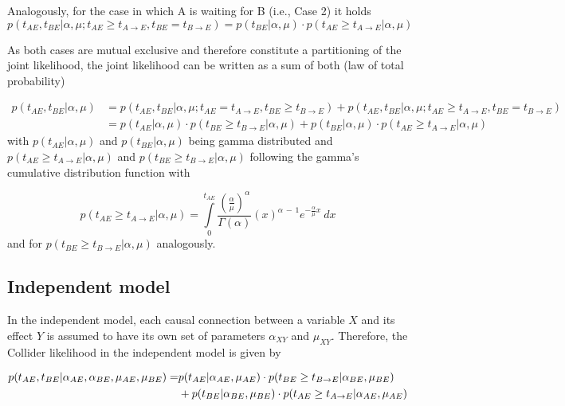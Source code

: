 Analogously, for the case in which A is waiting for B (i.e., Case 2) it holds
\begin{equation}
p(t_{AE}, t_{BE}|\alpha,\mu; t_{AE} \geq t_{A\rightarrow E}, t_{BE} = t_{B\rightarrow E}) = p(t_{BE}|\alpha,\mu)\cdot  p(t_{AE}\geq t_{A\rightarrow E}|\alpha,\mu)
\end{equation}

As both cases are mutual exclusive and therefore constitute a partitioning of the joint likelihood, the joint likelihood can be written as a sum of both (law of total probability)

\begin{align}
p(t_{AE}, t_{BE}|\alpha,\mu) &= p(t_{AE}, t_{BE}|\alpha,\mu; t_{AE} = t_{A\rightarrow E}, t_{BE} \geq t_{B\rightarrow E}) + p(t_{AE}, t_{BE}|\alpha,\mu; t_{AE} \geq t_{A\rightarrow E}, t_{BE} = t_{B\rightarrow E}) \\
&= p(t_{AE}|\alpha,\mu)\cdot p(t_{BE}\geq t_{B\rightarrow E}|\alpha,\mu) + p(t_{BE}|\alpha,\mu)\cdot p(t_{AE}\geq t_{A\rightarrow E}|\alpha,\mu)
\label{eq:time_collider_pooled_conjunctive}
\end{align}
with $p(t_{AE}|\alpha,\mu)$ and $p(t_{BE}|\alpha,\mu)$ being gamma distributed and $p(t_{AE}\geq t_{A\rightarrow E}|\alpha,\mu)$ and $p(t_{BE}\geq t_{B\rightarrow E}|\alpha,\mu)$ following the gamma's cumulative distribution function with

\begin{equation}
p(t_{AE}\geq t_{A\rightarrow E}|\alpha,\mu) = \int\limits_0^{t_{AE}} \frac{(\frac{\alpha}{\mu})^\alpha}{\Gamma(\alpha)} (x)^{\alpha \,-\, 1} e^{- \frac{\alpha}{\mu} x }~dx
\end{equation}
and for $p(t_{BE}\geq t_{B\rightarrow E}|\alpha,\mu)$ analogously.

\subsection*{Independent model}

In the independent model, each causal connection between a variable $X$ and its effect $Y$ is assumed to have its own set of parameters $\alpha_{XY}$ and $\mu_{XY}$. Therefore, the Collider likelihood in the independent model is given by

\begin{align}
p(t_{AE}, t_{BE}|\alpha_{AE}, \alpha_{BE},\mu_{AE}, \mu_{BE}) = &p(t_{AE}|\alpha_{AE},\mu_{AE})\cdot p(t_{BE}\geq t_{B\rightarrow E}|\alpha_{BE},\mu_{BE})\notag\\ &+ p(t_{BE}|\alpha_{BE},\mu_{BE})\cdot p(t_{AE}\geq t_{A\rightarrow E}|\alpha_{AE},\mu_{AE})
\label{eq:time_collider_independent_conjunctive}
\end{align}


